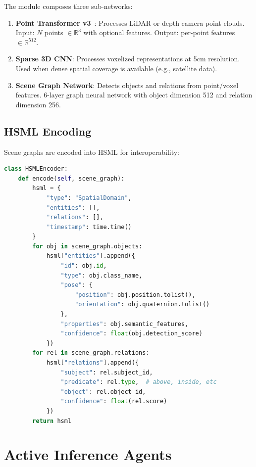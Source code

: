 \documentclass[11pt,letterpaper]{article}
\newcommand{\R}{\mathbb{R}}
\begin{document}
The module composes three sub-networks:

\begin{enumerate}
    \item \textbf{Point Transformer v3}~\cite{zhao2024point}: Processes LiDAR or depth-camera point clouds. Input: $N$ points $\in \R^3$ with optional features. Output: per-point features $\in \R^{512}$.
    \item \textbf{Sparse 3D CNN}: Processes voxelized representations at 5cm resolution. Used when dense spatial coverage is available (e.g., satellite data).
    \item \textbf{Scene Graph Network}: Detects objects and relations from point/voxel features. 6-layer graph neural network with object dimension 512 and relation dimension 256.
\end{enumerate}

\subsection{HSML Encoding}

Scene graphs are encoded into HSML for interoperability:

\begin{lstlisting}[language=Python,caption=HSML scene encoding]
class HSMLEncoder:
    def encode(self, scene_graph):
        hsml = {
            "type": "SpatialDomain",
            "entities": [],
            "relations": [],
            "timestamp": time.time()
        }
        for obj in scene_graph.objects:
            hsml["entities"].append({
                "id": obj.id,
                "type": obj.class_name,
                "pose": {
                    "position": obj.position.tolist(),
                    "orientation": obj.quaternion.tolist()
                },
                "properties": obj.semantic_features,
                "confidence": float(obj.detection_score)
            })
        for rel in scene_graph.relations:
            hsml["relations"].append({
                "subject": rel.subject_id,
                "predicate": rel.type,  # above, inside, etc
                "object": rel.object_id,
                "confidence": float(rel.score)
            })
        return hsml
\end{lstlisting}

\section{Active Inference Agents}
\end{document}
